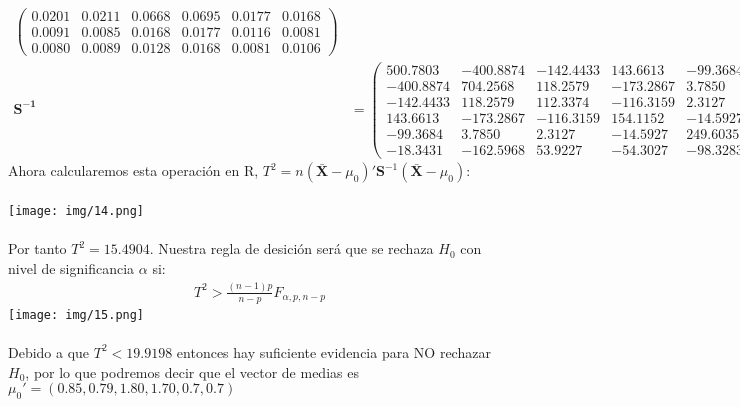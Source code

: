 \begin{sol}
\begin{itemize}
\begin{align*}
\begin{pmatrix}
        0.0201 & 0.0211 & 0.0668 & 0.0695 & 0.0177 & 0.0168 \\
        0.0091 & 0.0085 & 0.0168 & 0.0177 & 0.0116 & 0.0081 \\
        0.0080 & 0.0089 & 0.0128 & 0.0168 & 0.0081 & 0.0106
    \end{pmatrix} \\
    \mathbf{S^{-1}} &= \begin{pmatrix}
        500.7803 & -400.8874 & -142.4433 & 143.6613 & -99.3684 & -18.3431 \\
        -400.8874 & 704.2568 & 118.2579 & -173.2867 & 3.7850 & -162.5968 \\
        -142.4433 & 118.2579 & 112.3374 & -116.3159 & 2.3127 & 53.9227 \\
        143.6613 & -173.2867 & -116.3159 & 154.1152 & -14.5927 & -54.3027 \\
        -99.3684 & 3.7850 & 2.3127 & -14.5927 & 249.6035 & -98.3283 \\
        -18.3431 & -162.5968 & 53.9227 & -54.3027 & -98.3283 & 340.3370
    \end{pmatrix}
\end{align*}
Ahora calcularemos esta operación en R, $T^2=n(\bar{\mathbf{X}} - \mu_0)'\mathbf{S}^{-1}(\mathbf{\bar{X}}-\mu_0)$: \\\\
\texttt{[image: img/14.png]}\\\\
Por tanto $T^2 = 15.4904$. Nuestra regla de desición será que se rechaza $H_0$ con nivel de significancia $\alpha$ si:
\begin{align*}
T^2 > \frac{(n-1)p}{n-p}F_{\alpha,p,n-p}
\end{align*}
\texttt{[image: img/15.png]}\\\\
Debido a que $T^2<19.9198$ entonces hay suficiente evidencia para NO rechazar $H_0$, por lo que podremos decir que el vector de medias es  $\mu_0'=(0.85,0.79,1.80,1.70,0.7,0.7)$ \pagebreak


\end{itemize}
\end{sol}
